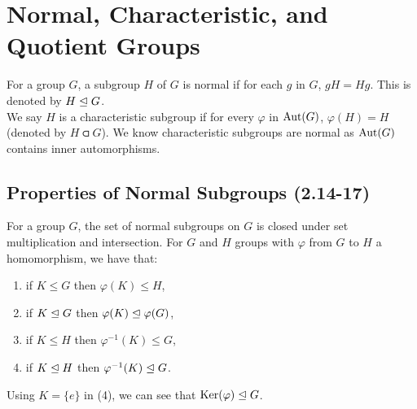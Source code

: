 \section{Normal, Characteristic, and Quotient Groups}

For a group $G$, a subgroup $H$ of $G$ is normal if for each $g$ in $G$,
$gH = Hg$. This is denoted by $H \trianglelefteq G$.
\\[\baselineskip]
We say $H$ is a characteristic subgroup if for every $\varphi$ in $\operatorname{Aut}(G)$,
$\varphi(H) = H$ (denoted by $H \csub G$). We know characteristic subgroups
are normal as $\operatorname{Aut}(G)$ contains inner automorphisms.

\subsection{Properties of Normal Subgroups (2.14-17)}
\label{2.14} \label{2.15} \label{2.16} \label{2.17}

For a group $G$, the set of normal subgroups on $G$
is closed under set multiplication and intersection. For $G$ and $H$
groups with $\varphi$ from $G$ to $H$ a homomorphism, we have that: \begin{enumerate}
    \item if $K \leq G$ then $\varphi(K) \leq H$,
    \item if $K \trianglelefteq G$ then $\varphi(K) \trianglelefteq \varphi(G)$,
    \item if $K \leq H$ then $\varphi^{-1}(K) \leq G$,
    \item if $K \trianglelefteq H$ then $\varphi^{-1}(K) \trianglelefteq G$.
\end{enumerate} Using $K = \{e\}$ in (4), we can see that $\operatorname{Ker}(\varphi) \trianglelefteq G$.

